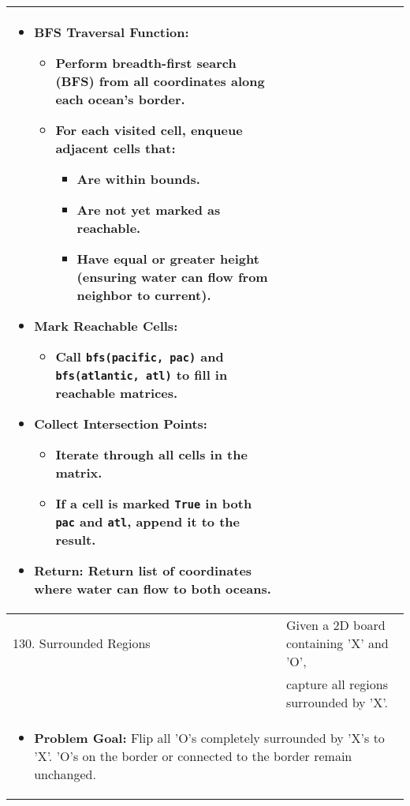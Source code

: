 \begin{summary}
\begin{center}
\begin{tabular}{ll}
{\begin{itemize}
                    \item \textbf{BFS Traversal Function:}
                    \begin{itemize}
                        \item Perform breadth-first search (BFS) from all coordinates along each ocean's border.
                        \item For each visited cell, enqueue adjacent cells that:
                        \begin{itemize}
                            \item Are within bounds.
                            \item Are not yet marked as reachable.
                            \item Have equal or greater height (ensuring water can flow from neighbor to current).
                        \end{itemize}
                    \end{itemize}
                
                    \item \textbf{Mark Reachable Cells:}
                    \begin{itemize}
                        \item Call \texttt{bfs(pacific, pac)} and \texttt{bfs(atlantic, atl)} to fill in reachable matrices.
                    \end{itemize}
                
                    \item \textbf{Collect Intersection Points:}
                    \begin{itemize}
                        \item Iterate through all cells in the matrix.
                        \item If a cell is marked \texttt{True} in both \texttt{pac} and \texttt{atl}, append it to the result.
                    \end{itemize}
                
                    \item \textbf{Return:} Return list of coordinates where water can flow to both oceans.
                \end{itemize}                             
            } \\
            \midrule
            130. Surrounded Regions & Given a 2D board containing 'X' and 'O', \\
            & capture all regions surrounded by 'X'. \\
            \multicolumn{2}{p{\linewidth}}{
                \begin{itemize}
                    \item \textbf{Problem Goal:} Flip all 'O's completely surrounded by 'X's to 'X'. 'O's on the border or connected to the border remain unchanged.
                

\end{itemize}}
\end{tabular}
\end{center}
\end{summary}
